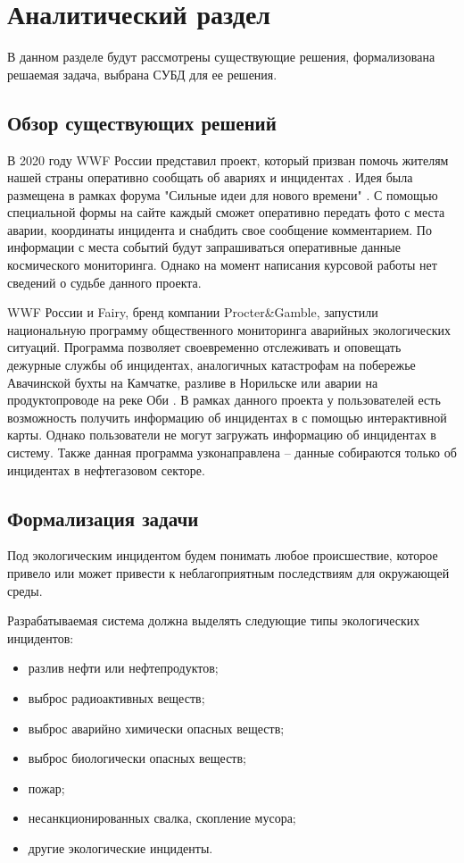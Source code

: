 \chapter{Аналитический раздел}
В данном разделе будут рассмотрены существующие решения, формализована решаемая задача, выбрана СУБД для ее решения. 

\section{Обзор существующих решений}
В 2020 году WWF России представил проект, который призван помочь жителям нашей страны оперативно сообщать об авариях и инцидентах \cite{wwf1}. Идея была размещена в рамках форума "Сильные идеи для нового времени" \cite{forum}. С помощью специальной формы на сайте каждый сможет оперативно передать фото с места аварии, координаты инцидента и снабдить свое сообщение комментарием. По информации с места событий будут запрашиваться оперативные данные космического мониторинга. Однако на момент написания курсовой работы нет сведений о судьбе данного проекта.

WWF России и Fairy, бренд компании Procter\&Gamble, запустили национальную программу общественного мониторинга аварийных экологических ситуаций. Программа позволяет своевременно отслеживать и оповещать дежурные службы об инцидентах, аналогичных катастрофам на побережье Авачинской бухты на Камчатке, разливе в Норильске или аварии на продуктопроводе на реке Оби \cite{wwf2}. В рамках данного проекта у пользователей есть возможность получить информацию об инцидентах в с помощью интерактивной карты. Однако пользователи не могут загружать информацию об инцидентах в систему. Также данная программа узконаправлена -- данные собираются только об инцидентах в нефтегазовом секторе. 

\section{Формализация задачи}
Под экологическим инцидентом будем понимать любое происшествие, которое привело или может привести к неблагоприятным последствиям для окружающей среды. 

Разрабатываемая система должна выделять следующие типы экологических инцидентов: 
\begin{itemize}
	\item разлив нефти или нефтепродуктов;
	\item выброс радиоактивных веществ;
	\item выброс аварийно химически опасных веществ;
	\item выброс биологически опасных веществ;
	\item пожар;
	\item несанкционированных свалка, скопление мусора;
	\item другие экологические инциденты.
\end{itemize}


